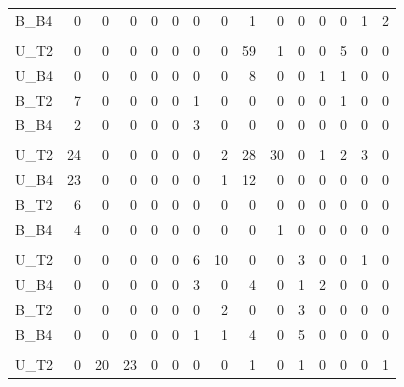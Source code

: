 \documentclass[
  12pt,
]{article}
\begin{document}
\begin{table}[!h]
{\begin{tabular}[t]{lrrrrrrrrrrrrrr}
\hspace{1em}B\_B4 & 0 & 0 & 0 & 0 & 0 & 0 & 0 & 1 & 0 & 0 & 0 & 0 & 1 & 2\\
\addlinespace[0.3em]
\multicolumn{15}{l}{\textit{\textbf{A. desertorum}}}\\
\hspace{1em}U\_T2 & 0 & 0 & 0 & 0 & 0 & 0 & 0 & 59 & 1 & 0 & 0 & 5 & 0 & 0\\
\hspace{1em}U\_B4 & 0 & 0 & 0 & 0 & 0 & 0 & 0 & 8 & 0 & 0 & 1 & 1 & 0 & 0\\
\hspace{1em}B\_T2 & 7 & 0 & 0 & 0 & 0 & 1 & 0 & 0 & 0 & 0 & 0 & 1 & 0 & 0\\
\hspace{1em}B\_B4 & 2 & 0 & 0 & 0 & 0 & 3 & 0 & 0 & 0 & 0 & 0 & 0 & 0 & 0\\
\addlinespace[0.3em]
\multicolumn{15}{l}{\textit{\textbf{C. testiculatum}}}\\
\hspace{1em}U\_T2 & 24 & 0 & 0 & 0 & 0 & 0 & 2 & 28 & 30 & 0 & 1 & 2 & 3 & 0\\
\hspace{1em}U\_B4 & 23 & 0 & 0 & 0 & 0 & 0 & 1 & 12 & 0 & 0 & 0 & 0 & 0 & 0\\
\hspace{1em}B\_T2 & 6 & 0 & 0 & 0 & 0 & 0 & 0 & 0 & 0 & 0 & 0 & 0 & 0 & 0\\
\hspace{1em}B\_B4 & 4 & 0 & 0 & 0 & 0 & 0 & 0 & 0 & 1 & 0 & 0 & 0 & 0 & 0\\
\addlinespace[0.3em]
\multicolumn{15}{l}{\textit{\textbf{C. parviflora}}}\\
\hspace{1em}U\_T2 & 0 & 0 & 0 & 0 & 0 & 6 & 10 & 0 & 0 & 3 & 0 & 0 & 1 & 0\\
\hspace{1em}U\_B4 & 0 & 0 & 0 & 0 & 0 & 3 & 0 & 4 & 0 & 1 & 2 & 0 & 0 & 0\\
\hspace{1em}B\_T2 & 0 & 0 & 0 & 0 & 0 & 0 & 2 & 0 & 0 & 3 & 0 & 0 & 0 & 0\\
\hspace{1em}B\_B4 & 0 & 0 & 0 & 0 & 0 & 1 & 1 & 4 & 0 & 5 & 0 & 0 & 0 & 0\\
\addlinespace[0.3em]
\multicolumn{15}{l}{\textit{\textbf{S. altissimum}}}\\
\hspace{1em}U\_T2 & 0 & 20 & 23 & 0 & 0 & 0 & 0 & 1 & 0 & 1 & 0 & 0 & 0 & 1\\

\end{tabular}}
\end{table}
\end{document}
